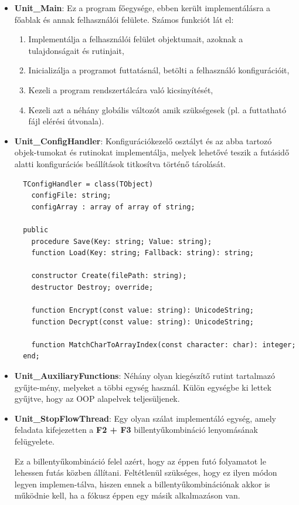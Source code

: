 \begin{itemize}
	\item{
		\textbf{Unit\_Main}: Ez a program főegysége, ebben került implementálásra a főablak és annak felhasználói felülete. Számos funkciót lát el:
		\begin{enumerate}
			\item{Implementálja a felhasználói felület objektumait, azoknak a tulajdonságait és rutinjait,}
			\item{Inicializálja a programot futtatásnál, betölti a felhasználó konfigurációit,}
			\item{Kezeli a program rendszertálcára való kicsinyítését,}
			\item{Kezeli azt a néhány globális változót amik szükségesek (pl. a futtatható fájl elérési útvonala).}			
		\end{enumerate}
	}
	\item{
		\textbf{Unit\_ConfigHandler}: Konfigurációkezelő osztályt és az abba tartozó objek\hyp{}tumokat és rutinokat implementálja, melyek lehetővé teszik a futásidő alatti konfigurációs beállítások titkosítva történő tárolását.
		\begin{lstlisting}
  TConfigHandler = class(TObject)
    configFile: string;
    configArray : array of array of string;

  public
    procedure Save(Key: string; Value: string);
    function Load(Key: string; Fallback: string): string;

    constructor Create(filePath: string);
    destructor Destroy; override;

    function Encrypt(const value: string): UnicodeString;
    function Decrypt(const value: string): UnicodeString;

    function MatchCharToArrayIndex(const character: char): integer;
  end;
		\end{lstlisting}
	}
	\item{
		\textbf{Unit\_AuxiliaryFunctions}: Néhány olyan kiegészítő rutint tartalmazó gyűjte\hyp{}mény, melyeket a többi egység használ. Külön egységbe ki lettek gyűjtve, hogy az OOP alapelvek teljesüljenek.
	}
	\item{
		\textbf{Unit\_StopFlowThread}: Egy olyan szálat implementáló egység, amely feladata kifejezetten a \textbf{F2 + F3} billentyűkombináció lenyomásának felügyelete.

		Ez a billentyűkombináció felel azért, hogy az éppen futó folyamatot le lehessen futás közben állítani. Feltétlenül szükséges, hogy ez ilyen módon legyen implemen\hyp{}tálva, hiszen ennek a billentyűkombinációnak akkor is működnie kell, ha a fókusz éppen egy másik alkalmazáson van.

}
\end{itemize}
